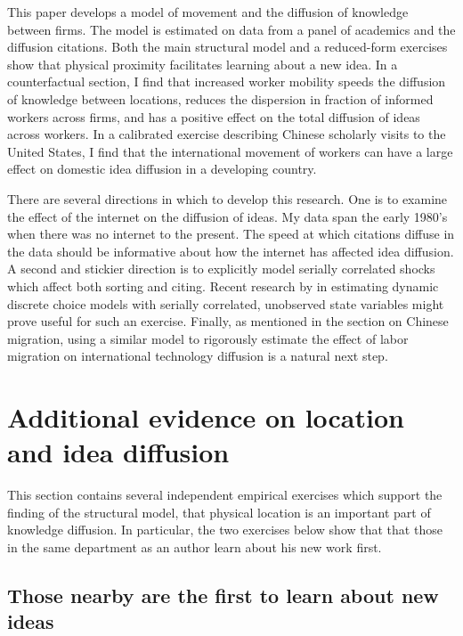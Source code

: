 This paper develops a model of movement and the diffusion of knowledge
between firms. The model is estimated on data from a panel of academics
and the diffusion citations. Both the main structural model and
a reduced-form exercises show that physical proximity facilitates learning
 about a new idea. In a counterfactual section, I find that increased worker mobility
 speeds the diffusion of knowledge between locations, reduces 
the dispersion in fraction of informed workers across firms, and has a
positive effect on the total diffusion of ideas across workers.
In a calibrated exercise describing Chinese scholarly visits to the United
States, I find that the international movement of workers can have a large 
effect on domestic idea diffusion in a developing country.

There are several directions in which to develop this research.  One is to examine the effect of the internet on the diffusion of ideas.  My data span the early 1980's when there was no internet to the present.  The speed at which citations diffuse in the data should be informative about how the internet has affected idea diffusion.  A second and stickier direction is to explicitly model serially correlated shocks which affect both sorting and citing.  Recent research by \citet{arcidiacono2011conditional} in estimating dynamic discrete choice models with serially correlated, unobserved state variables might prove useful for such an exercise.  Finally, as mentioned in the section on Chinese migration, using a similar model to rigorously estimate the effect of labor migration on international technology diffusion is a natural next step.


\section{Additional evidence on location and idea diffusion}
\label{sec:add_evid}

This section contains several independent empirical exercises which
support the finding of the structural model, that physical location is
an important part of knowledge diffusion. In particular, the two
exercises below show that that those in the same department as an author
learn about his new work first.

\subsection{Those nearby are the first to learn about new ideas}

